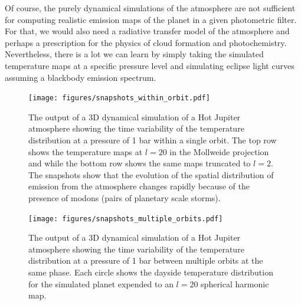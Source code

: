 \documentclass[12pt,dvipsnames]{report}
\begin{document}
Of course, the purely dynamical simulations of the atmosphere are not sufficient for 
computing realistic emission maps of the planet in a given photometric filter.
For that, we would also need a radiative transfer model of the atmosphere and perhaps 
a prescription for the physics of cloud formation and photochemistry. 
Nevertheless, there is a lot 
we can learn by simply taking the simulated temperature maps at a specific pressure 
level and simulating eclipse light curves assuming a blackbody emission spectrum.

\begin{figure}[t!]
    \begin{centering}
        \texttt{[image: figures/snapshots\_within\_orbit.pdf]}
        \caption{
            The output of  a 3D dynamical simulation of a Hot Jupiter atmosphere
            showing the time variability of the temperature distribution at a pressure 
            of 1 bar within a single orbit.
            The top row shows the temperature maps at $l=20$ in  
            the Mollweide projection and while the bottom row shows the same maps 
            truncated to $l=2$.
            The snapshots show that the evolution of the spatial distribution 
            of emission from the atmosphere changes rapidly because of the presence 
            of modons (pairs of planetary scale storms).
        }
        \label{fig:snapshots_within_orbit}
    \end{centering}
\end{figure}

\begin{figure}[t!]
    \begin{centering}
        \texttt{[image: figures/snapshots\_multiple\_orbits.pdf]}
        \caption{
         The output of a 3D dynamical simulation of a Hot Jupiter atmosphere
            showing the time variability of the temperature distribution at a pressure 
            of 1 bar between multiple orbits at the same phase. 
            Each circle shows the dayside temperature distribution for the simulated planet
            expended to an $l=20$ spherical harmonic map.
        }
        \label{fig:snapshots_multiple_orbits}
    \end{centering}
\end{figure}
\end{document}
